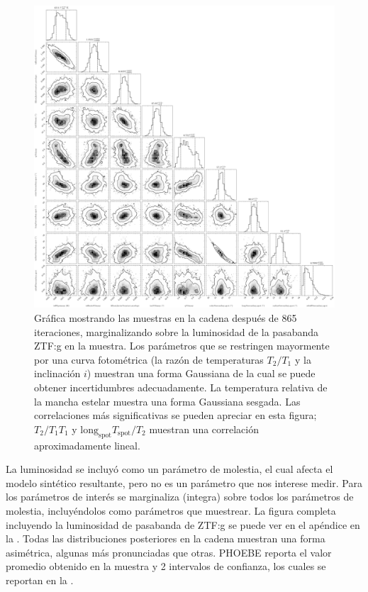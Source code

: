 \begin{figure}[!ht]
	\centering
	\includegraphics[scale=0.29]{Metodologia/Secciones/ModeloComputacional/Figures/Figura MCMC ZTF Resultados.png}
	\caption{Gráfica mostrando las muestras en la cadena después de 865
	iteraciones, marginalizando sobre la luminosidad de la pasabanda ZTF:g en la
	muestra. Los parámetros que se restringen mayormente por una curva
	fotométrica (la razón de temperaturas $T_2/T_1$ y la inclinación $i$)
	muestran una forma Gaussiana de la cual se puede obtener incertidumbres
	adecuadamente. La temperatura relativa de la mancha estelar 
	muestra una forma Gaussiana sesgada. Las correlaciones más significativas se
	pueden apreciar en esta figura; $T_2/T_1$\textemdash $T_1$ y
	$\mathrm{long}_{\mathrm{spot}}$\textemdash $T_{\mathrm{spot}}/T_2$ muestran
	una correlación aproximadamente lineal.}
	\label{figuraMcmcZtfResultadosPrimarios}
\end{figure}

La luminosidad se incluyó como un parámetro de molestia, el cual afecta el
modelo sintético resultante, pero no es un parámetro que nos interese medir.
Para los parámetros de interés se marginaliza (integra) sobre todos los
parámetros de molestia, incluyéndolos como parámetros que muestrear. La figura
completa incluyendo la luminosidad de pasabanda de ZTF:g se puede ver en el
apéndice en la . Todas las
distribuciones posteriores en la cadena muestran una forma asimétrica, algunas
más pronunciadas que otras. PHOEBE reporta el valor promedio obtenido en la
muestra y 2 intervalos de confianza, los cuales se reportan en la
.

